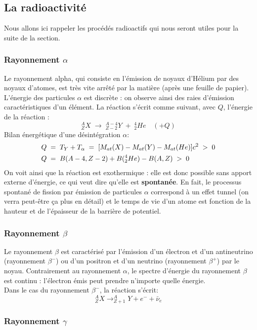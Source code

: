\subsection{La radioactivité}


Nous allons ici rappeler les procédés radioactifs qui nous seront utiles pour la suite de la section.

\subsubsection{Rayonnement $\alpha$}

Le rayonnement alpha, qui consiste en l'émission de noyaux d'Hélium par des noyaux d'atomes, est très vite arrêté par la matière (après une feuille de papier). L'énergie des particules $\alpha$ est discrète : on observe ainsi des raies d'émission caractéristiques d'un élément. La réaction s'écrit comme suivant, avec $Q$, l'énergie de la réaction :
\[
    ^{A}_{Z}X \;\rightarrow\; ^{A-4}_{Z-2}Y \;+\; ^{4}_{2}He \quad(+Q)
\]
Bilan énergétique d'une désintégration $\alpha$:
\begin{align*}
    Q &\; = \;
    T_Y + T_\alpha \; = \; [M_{at}(X)-M_{at}(Y)-M_{at}(He)]c^2 \;>\;0\\
    Q &\; = \; B(A-4,Z-2)+B(^{4}_{2}He)-B(A,Z) \;>\;0
\end{align*}
On voit ainsi que la réaction est exothermique : elle est donc possible sans apport externe d'énergie, ce qui veut dire qu'elle est \textbf{spontanée}. En fait, le processus spontané de fission par émission de particules $\alpha$ correspond à un effet tunnel (on verra peut-être ça plus en détail) et le temps de vie d'un atome est fonction de la hauteur et de l'épaisseur de la barrière de potentiel.

\subsubsection{Rayonnement $\beta$}


Le rayonnement $\beta$ est caractérisé par l'émission d'un électron et d'un antineutrino (rayonnement $\beta^-$) ou d'un positron et d'un neutrino (rayonnement $\beta^+$) par le noyau. Contrairement au rayonnement $\alpha$, le spectre d'énergie du rayonnement $\beta$ est continu : l'électron émis peut prendre n'importe quelle énergie.\\
Dans le cas du rayonnement $\beta^-$, la réaction s'écrit:
\[
    ^{A}_{Z}X \rightarrow ^{A}_{Z+1}Y + e^- + \bar{\nu}_e
\]

\subsubsection{Rayonnement $\gamma$}


